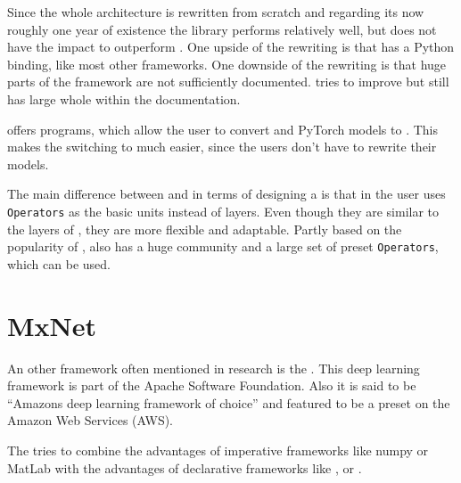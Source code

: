 Since the whole architecture is rewritten from scratch and regarding its now roughly one year of existence the library performs relatively well, but does not have the impact to outperform \caffe \cite{heise:Caffe2}.
One upside of the rewriting is that \caffetwo has a Python binding, like most other frameworks. One downside of the rewriting is that huge parts of the framework are not sufficiently documented. \caffetwo tries to improve but still has large whole within the documentation. \cite{tim2018CNNArchLang}

\caffetwo offers programs, which allow the user to convert \caffe and PyTorch models to \caffetwo. This makes the switching to \caffetwo much easier, since the users don't have to rewrite their models. \cite{Caffe2Homepage}

The main difference between \caffe and \caffetwo in terms of designing a \nn is that in \caffetwo the user uses \texttt{Operators} as the basic units instead of layers. Even though they are similar to the layers of \caffe, they are more flexible and adaptable. Partly based on the popularity of \caffe, \caffetwo also has a huge community and a large set of preset \texttt{Operators}, which can be used. \cite{Caffe2Homepage}


\section{MxNet}\label{sec: MxNet}

An other framework often mentioned in research is the \mxnet. This deep learning framework is part of the Apache Software Foundation. Also it is said to be ``Amazons deep learning framework of choice'' \cite{infoworld} and featured to be a preset on the Amazon Web Services (AWS). \cite{chenmxnet}

The \mxnet tries to combine the advantages of imperative frameworks like numpy or MatLab with the advantages of declarative frameworks like \caffe, \caffetwo or \tensorflow.

